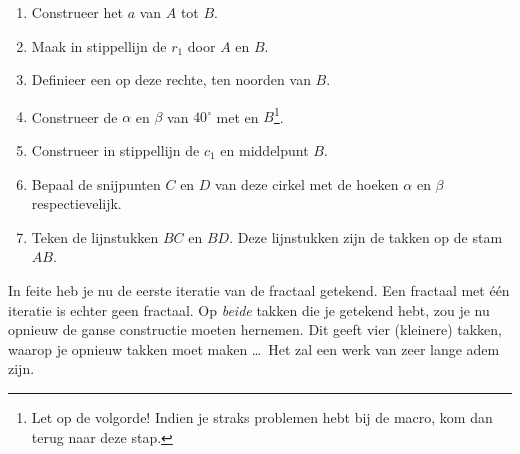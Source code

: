\begin{enumerate}
\item Construeer het  $a$ van $A$ tot $B$.
\item Maak in stippellijn de  $r_1$ door $A$ en $B$.
\item Definieer een   op deze rechte, ten noorden van $B$.
\item Construeer de  $\alpha$ en $\beta$ van $40^\circ$ met   en  $B$\footnote{Let op de volgorde! Indien je straks problemen hebt bij de macro, kom dan terug naar deze stap.}. \label{voetnoot_lindmayer}
\item Construeer in stippellijn de  $c_1$    en middelpunt $B$.
\item Bepaal de snijpunten $C$ en $D$ van deze cirkel met de hoeken $\alpha$ en $\beta$ respectievelijk.
\item Teken de lijnstukken $BC$ en $BD$. Deze lijnstukken zijn de takken op de stam $AB$.
\end{enumerate}

In feite heb je nu de eerste iteratie van de fractaal getekend. Een fractaal met \'e\'en iteratie is echter geen fractaal. Op {\it beide} takken die je getekend hebt, zou je nu opnieuw de ganse constructie moeten hernemen. Dit geeft vier (kleinere) takken, waarop je opnieuw takken moet maken \dots\ Het zal een werk van zeer lange adem zijn.

